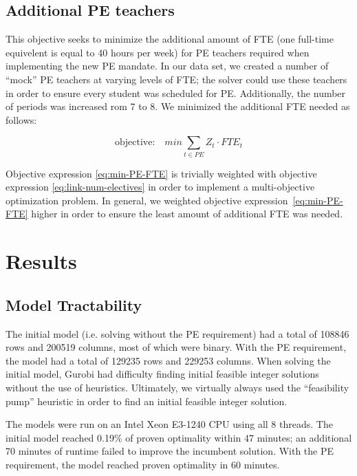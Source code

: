 \documentclass[12pt]{article}
\begin{document}
\subsection{Additional PE teachers}

This objective seeks to minimize the additional amount of FTE (one full-time equivelent is equal to 40 hours per week) for PE teachers required when implementing the new PE mandate. In our data set, we created a number of ``mock'' PE teachers at varying levels of FTE; the solver could use these teachers in order to ensure every student was scheduled for PE. Additionally, the number of periods was increased rom 7 to 8. We minimized the additional FTE needed as follows:

\begin{equation} \label{eq:min-PE-FTE}
	\text{objective:}\quad min \displaystyle\sum_{t \in PE} Z_{t} \cdot FTE_{t}
\end{equation}

Objective expression \ref{eq:min-PE-FTE} is trivially weighted with objective expression \ref{eq:link-num-electives} in order to implement a multi-objective optimization problem. In general, we weighted objective expression~\ref{eq:min-PE-FTE} higher in order to ensure the least amount of additional FTE was needed.

\section{Results}

\subsection{Model Tractability}

The initial model (i.e. solving without the PE requirement) had a total of 108846 rows and 200519 columns, most of which were binary. With the PE requirement, the model had a total of 129235 rows and 229253 columns. When solving the initial model, Gurobi had difficulty finding initial feasible integer solutions without the use of heuristics. Ultimately, we virtually always used the ``feasibility pump'' \cite{Fischetti2005} heuristic in order to find an initial feasible integer solution.

The models were run on an Intel Xeon E3-1240 CPU using all 8 threads. The initial model reached 0.19\% of proven optimality within 47 minutes; an additional 70 minutes of runtime failed to improve the incumbent solution. With the PE requirement, the model reached proven optimality in 60 minutes.
\end{document}
